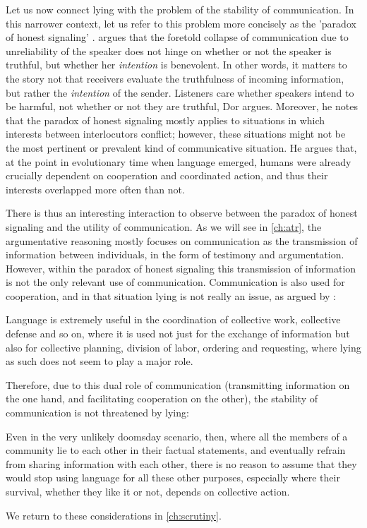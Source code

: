 Let us now connect lying with the problem of the stability of communication. In this narrower context, let us refer to this problem more concisely as the 'paradox of honest signaling' \citep[following][]{Dor17}.
\citet{Dor17} argues that the foretold collapse of communication due to unreliability of the speaker does not hinge on whether or not the speaker is truthful, but whether her \emph{intention} is benevolent.
In other words, it matters to the story not that receivers evaluate the truthfulness of incoming information, but rather the \emph{intention} of the sender. Listeners care whether speakers intend to be harmful, not whether or not they are truthful, Dor argues.
Moreover, he notes that the paradox of honest signaling mostly applies to situations in which interests between interlocutors conflict; however, these situations might not be the most pertinent or prevalent kind of communicative situation.
He argues that, at the point in evolutionary time when language emerged, humans were already crucially dependent on cooperation and coordinated action, and thus their interests overlapped more often than not.

There is thus an interesting interaction to observe between the paradox of honest signaling and the utility of communication. As we will see in \cref{ch:atr}, the argumentative reasoning mostly focuses on communication as the transmission of information between individuals, in the form of testimony and argumentation. However, within the paradox of honest signaling this transmission of information is not the only relevant use of communication. Communication is also used for cooperation, and in that situation lying is not really an issue, as argued by \citet{Dor17}:
\begin{quoting}
    Language is extremely useful in the coordination of collective work, collective defense and so on, where it is used not just for the exchange of information but also for collective planning, division of labor, ordering and requesting, where lying as such does not seem to play a major role.
    \\ \hfill \citep[p.~51]{Dor17}
\end{quoting}
Therefore, due to this dual role of communication (transmitting information on the one hand, and facilitating cooperation on the other), the stability of communication is not threatened by lying:
\begin{quoting}
    Even in the very unlikely doomsday scenario, then, where all the members of a community lie to each other in their factual statements, and eventually refrain from sharing information with each other, there is no reason to assume that they would stop using language for all these other purposes, especially where their survival, whether they like it or not, depends on collective action.
    \hfill \citep[p.~52]{Dor17}
\end{quoting}
We return to these considerations in \cref{ch:scrutiny}.

